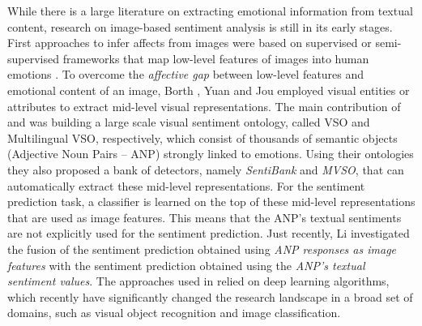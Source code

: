 While there is a large literature on extracting emotional information from textual content, research on image-based sentiment analysis is still in its early stages.
First approaches to infer affects from images were based on supervised or semi-supervised frameworks that map low-level features of images into human emotions \cite{machajdik2010affective,siersdorfer2010analyzing}. %
To overcome the \textit{affective gap} between low-level features and emotional content of an image, Borth \etal \cite{Borth2013:Large-scale}, Yuan \etal \cite{yuan2013sentribute} and Jou \etal \cite{Jou2015:VisualAffect} employed visual entities or attributes to extract mid-level visual representations.
The main contribution of \cite{Borth2013:Large-scale} and \cite{Jou2015:VisualAffect} was building a large scale visual sentiment ontology, called VSO and Multilingual VSO, respectively, which consist of thousands of semantic objects (Adjective Noun Pairs -- ANP) strongly linked to emotions. Using their ontologies they also proposed  a bank of detectors, namely \textit{SentiBank} and \textit{MVSO}, that can automatically extract these mid-level representations.
For the sentiment prediction task, a classifier is learned on the top of
these mid-level representations that are used as image features.
This means that the ANP's textual sentiments are not explicitly used for the sentiment prediction. Just recently, Li \etal \cite{Li2017} investigated the fusion of the sentiment prediction obtained using \textit{ANP responses as image features} with the sentiment prediction obtained using the \textit{ANP's textual sentiment values}.
The approaches used in \cite{Jou2015:VisualAffect,Li2017} relied on deep learning algorithms, which recently have significantly changed the research landscape in a broad set of domains, such as visual object recognition and image classification. %
